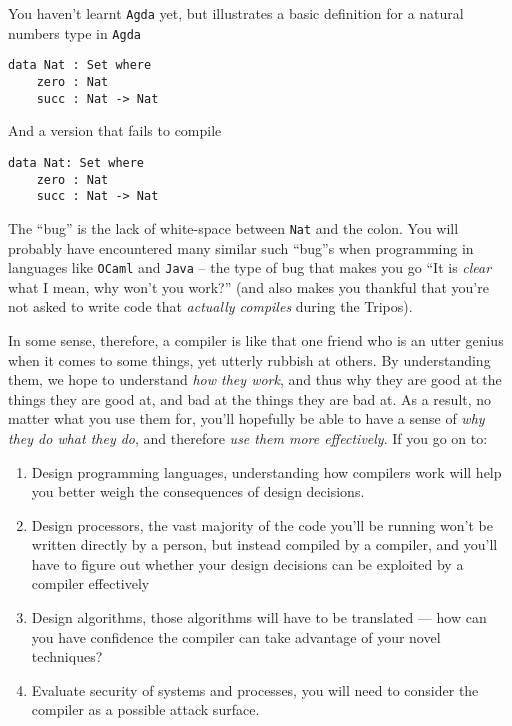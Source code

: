 You haven't learnt \texttt{Agda} yet, but  illustrates a basic definition for a natural numbers type in \texttt{Agda} 

\begin{code}
\label{code:agda-nat-good}
\begin{verbatim}
data Nat : Set where
    zero : Nat
    succ : Nat -> Nat
\end{verbatim}
\end{code}

And   a version that fails to compile 

\begin{code}
\label{code:agda-nat-bad}
\begin{verbatim}
data Nat: Set where
    zero : Nat
    succ : Nat -> Nat
\end{verbatim}
\end{code}

The ``bug'' is the lack of white-space between \texttt{Nat} and the colon. You will probably have encountered many similar such ``bug''s when programming in languages like \texttt{OCaml} and \texttt{Java} -- the type of bug that makes you go ``It is \emph{clear} what I mean, why won't you work?'' (and also makes you thankful that you're not asked to write code that \emph{actually compiles} during the Tripos).

In some sense, therefore, a compiler is like that one friend who is an utter genius when it comes to some things, yet utterly rubbish at others. By understanding them, we hope to understand \emph{how they work}, and thus why they are good at the things they are good at, and bad at the things they are bad at. As a result, no matter what you use them for, you'll hopefully be able to have a sense of \emph{why they do what they do}, and therefore \emph{use them more effectively}. If you go on to:

\begin{enumerate}
    \item Design programming languages, understanding how compilers work will help you better weigh the consequences of design decisions. 
    \item Design processors, the vast majority of the code you'll be running won't be written directly by a person, but instead compiled by a compiler, and you'll have to figure out whether your design decisions can be exploited by a compiler effectively
    \item Design algorithms, those algorithms will have to be translated --- how can you have confidence the compiler can take advantage of your novel techniques?
    \item Evaluate security of systems and processes, you will need to consider the compiler as a possible attack surface.
\end{enumerate}

